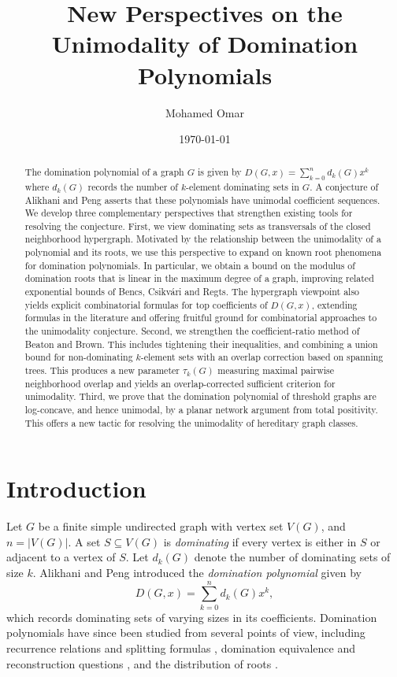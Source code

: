 \documentclass[11pt]{amsart}
\title{New Perspectives on the Unimodality of Domination Polynomials}
\author{Mohamed Omar}
\date{\today}
\numberwithin{equation}{section}
\newcommand{\VV}{V(G)}
\begin{document}
\begin{abstract}
The domination polynomial of a graph $G$ is given by $D(G,x)=\sum_{k=0}^{n} d_k(G)x^k$ where $d_k(G)$ records the number of $k$-element dominating sets in $G$. A conjecture of Alikhani and Peng asserts that these polynomials have unimodal coefficient sequences. We develop three complementary perspectives that strengthen existing tools for resolving the conjecture. First, we view dominating sets as transversals of the closed neighborhood hypergraph. Motivated by the relationship between the unimodality of a polynomial and its roots, we use this perspective to expand on known root phenomena for domination polynomials. In particular, we obtain a bound on the modulus of domination roots that is linear in the maximum degree of a graph, improving related exponential bounds of Bencs, Csikv\'{a}ri and Regts. The hypergraph viewpoint also yields explicit combinatorial formulas for top coefficients of $D(G,x)$, extending formulas in the literature and offering fruitful ground for combinatorial approaches to the unimodality conjecture. Second, we strengthen the coefficient-ratio method of Beaton and Brown. This includes tightening their inequalities, and combining a union bound for non-dominating $k$-element sets with an overlap correction based on spanning trees. This produces a new parameter $\tau_k(G)$ measuring maximal pairwise neighborhood overlap and yields an overlap-corrected sufficient criterion for unimodality. Third, we prove that the domination polynomial of threshold graphs are log-concave, and hence unimodal, by a planar network argument from total positivity. This offers a new tactic for resolving the unimodality of hereditary graph classes.
\end{abstract}

\maketitle

\section{Introduction}

Let $G$ be a finite simple undirected graph with vertex set $\VV$, and $n=|\VV|$. A set $S\subseteq \VV$ is \emph{dominating} if every vertex is either in $S$ or adjacent to a vertex of $S$. Let $d_k(G)$ denote the number of dominating sets of size $k$. Alikhani and Peng \cite{AlikhaniPeng2014} introduced the  \emph{domination polynomial} given by
\begin{equation}\label{eq:defDomPoly}
D(G,x) = \sum_{k=0}^{n} d_k(G) x^k,
\end{equation}
which records dominating sets of varying sizes in its coefficients. Domination polynomials have since been studied from several points of view, including recurrence relations and splitting formulas \cite{KotekTittmannTrinks2012}, domination equivalence and reconstruction questions \cite{BeatonPaths2019}, and the distribution of roots \cite{BeatonBrown2022,BeatonBrownRealRoots2021,BencsCsikvariRegts2021}. 
\end{document}
